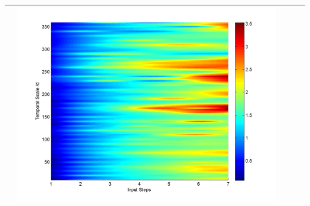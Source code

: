 \documentclass[11pt]{article}
\begin{document}
\begin{table}[H]
{\begin{tabular}{ccccc}
&\begin{minipage}{.3\textwidth}\includegraphics[width=\linewidth]{resultgraph/06810000pepq.png}\end{minipage}
\\
\bottomrule
\end{tabular}
}
\label{table:AU}
\end{table}
\end{document}
